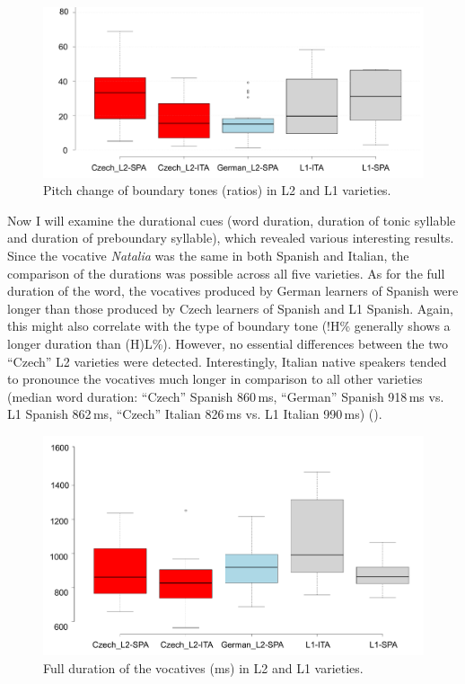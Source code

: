 \begin{figure}


\includegraphics[width=\textwidth]{figures/Figure_146.pdf}



\caption{Pitch change of boundary tones (ratios) in L2 and L1 varieties.}
\label{fig:4.146}
\end{figure}


Now I will examine the durational cues (word duration, duration of tonic syllable and duration of preboundary syllable), which revealed various interesting results. Since the vocative \textit{Natalia} was the same in both Spanish and Italian, the comparison of the durations was possible across all five varieties. As for the full duration of the word, the vocatives produced by German learners of Spanish were longer than those produced by Czech learners of Spanish and L1 Spanish. Again, this might also correlate with the type of boundary tone (!H\% generally shows a longer duration than (H)L\%). However, no essential differences between the two “Czech” L2 varieties were detected. Interestingly, Italian native speakers tended to pronounce the vocatives much longer in comparison to all other varieties (median word duration: “Czech” Spanish 860\,ms, “German” Spanish 918\,ms vs. L1 Spanish 862\,ms, “Czech” Italian 826\,ms vs. L1 Italian 990\,ms) ().


\begin{figure}


\includegraphics[width=\textwidth]{figures/Figure_147.pdf}



\caption{Full duration of the vocatives (ms) in L2 and L1 varieties.}
\label{fig:4.147}
\end{figure}

